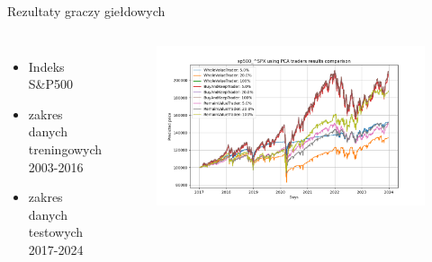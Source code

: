 \begin{frame}{Rezultaty graczy giełdowych}
    \begin{columns}[t]
            \begin{itemize}
                \item Indeks S\&P500
                \item zakres danych treningowych 2003-2016
                \item zakres danych testowych 2017-2024
            \end{itemize}
        \centering
        \begin{figure}
            \centering
            \includegraphics[width=1\textwidth]{images/pca_traders.png}
        \end{figure}    
    \end{columns}
\end{frame}
